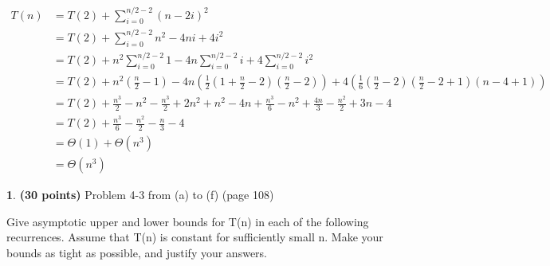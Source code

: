 \documentclass[11pt]{article}
\theoremstyle{definition}
\theoremstyle{theorem}
\newtheorem{prob}{}
\begin{document}
\begin{enumerate}[label=(\alph*)]
\[
\begin{split}
T(n) & = T(2) + \sum_{i=0}^{n/2-2} (n - 2i)^2 \\
& = T(2) + \sum_{i=0}^{n/2-2} n^2 - 4ni + 4i^2 \\
& = T(2) + n^2 \sum_{i=0}^{n/2-2} 1 - 4n \sum_{i=0}^{n/2-2} i + 4 \sum_{i=0}^{n/2-2} i^2 \\
& = T(2) + n^2 (\frac{n}{2} - 1) - 4n (\frac{1}{2} (1 + \frac{n}{2} - 2) (\frac{n}{2} - 2)) + 4 (\frac{1}{6} (\frac{n}{2} - 2) (\frac{n}{2} - 2 + 1) (n - 4 + 1)) \\
& = T(2) + \frac{n^3}{2} - n^2 - \frac{n^3}{2} + 2n^2 + n^2 - 4n + \frac{n^3}{6} - n^2 + \frac{4n}{3} - \frac{n^2}{2} + 3n - 4 \\
& = T(2) + \frac{n^3}{6} - \frac{n^2}{2} - \frac{n}{3} - 4 \\
& = \Theta(1) + \Theta(n^3) \\
& = \Theta(n^3)
\end{split}
\] 

\end{enumerate}

\newpage
\begin{prob} \textbf{(30 points)} Problem 4-3 from (a) to (f) (page 108)
\end{prob}

Give asymptotic upper and lower bounds for T(n) in each of the following recurrences. Assume that T(n) is constant for sufficiently small n. Make your bounds as tight as possible, and justify your answers.
\end{document}
